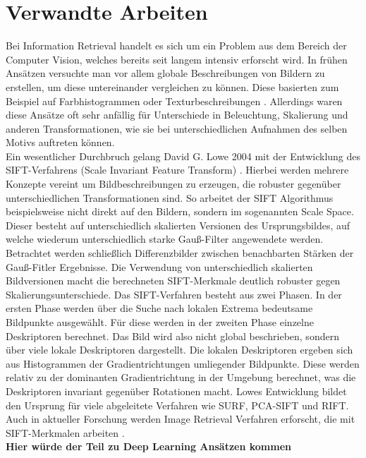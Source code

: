 \section*{Verwandte Arbeiten}
Bei Information Retrieval handelt es sich um ein Problem aus dem Bereich der Computer Vision, welches bereits seit langem intensiv erforscht wird. In frühen Ansätzen versuchte man vor allem globale Beschreibungen von Bildern zu erstellen, um diese untereinander vergleichen zu können. Diese basierten zum Beispiel auf Farbhistogrammen oder Texturbeschreibungen \cite{early_days}. Allerdings waren diese Ansätze oft sehr anfällig für Unterschiede in Beleuchtung, Skalierung und anderen Transformationen, wie sie bei unterschiedlichen Aufnahmen des selben Motivs auftreten können.
\\
Ein wesentlicher Durchbruch gelang David G. Lowe 2004 mit der Entwicklung des SIFT-Verfahrens (Scale Invariant Feature Transform) \cite{sift}. Hierbei werden mehrere Konzepte vereint um Bildbeschreibungen zu erzeugen, die robuster gegenüber unterschiedlichen Transformationen sind. So arbeitet der SIFT Algorithmus beispielsweise nicht direkt auf den Bildern, sondern im sogenannten Scale Space. Dieser besteht auf unterschiedlich skalierten Versionen des Ursprungsbildes, auf welche wiederum unterschiedlich starke Gauß-Filter angewendete werden. Betrachtet werden schließlich Differenzbilder zwischen benachbarten Stärken der Gauß-Fitler Ergebnisse. Die Verwendung von unterschiedlich skalierten Bildversionen macht die berechneten SIFT-Merkmale deutlich robuster gegen Skalierungsunterschiede. Das SIFT-Verfahren besteht aus zwei Phasen. In der ersten Phase werden über die Suche nach lokalen Extrema bedeutsame Bildpunkte ausgewählt. Für diese werden in der zweiten Phase einzelne Deskriptoren berechnet. Das Bild wird also nicht global beschrieben, sondern über viele lokale Deskriptoren dargestellt. Die lokalen Deskriptoren ergeben sich aus Histogrammen der Gradientrichtungen umliegender Bildpunkte. Diese werden relativ zu der dominanten Gradientrichtung in der Umgebung berechnet, was die Deskriptoren invariant gegenüber Rotationen macht. Lowes Entwicklung bildet den Ursprung für viele abgeleitete Verfahren wie SURF\cite{surf}, PCA-SIFT\cite{pca_sift} und RIFT\cite{rift}. Auch in aktueller Forschung werden Image Retrieval Verfahren erforscht, die mit SIFT-Merkmalen arbeiten \cite{modern_sift_useage}. \\
\textbf{Hier würde der Teil zu Deep Learning Ansätzen kommen}
\\
